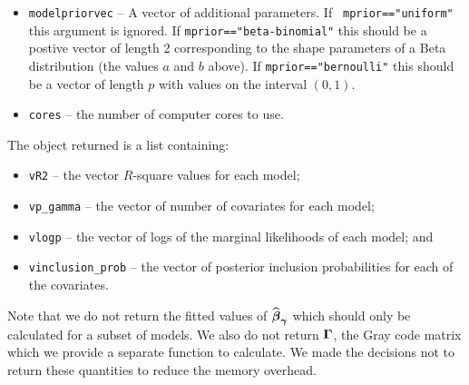 {\begin{itemize}
\begin{itemize}
        \noindent which is a beta-binomial distribution. Note $a=b=1$
        corresponds to a uniform prior on the prior variable inclusion
        probability. The values of $a$ and $b$ should be set to be the first
        and second elements of the {\tt modelpriorvec} argument respectively
        (see below).
		
		\item {\tt "bernoulli"} -- corresponds to a prior of the form 
		$$
		p(\vgamma) = \prod_{j=1}^p \rho_j^{\gamma_j} (1 - \rho_j)^{1 - \gamma_j}
		$$
		
        \noindent where the $\rho_j\in(0,1)$. The $\rho_j$ values are specified
        by {\tt modelpriorvec} (see below). Using $\rho_j = 1/2$, $1\le j\le p$
        corresponds to {\tt mprior=="uniform"}.
	\end{itemize}
	
    \item {\tt modelpriorvec} -- A vector of additional parameters. If {\tt
        mprior=="uniform"} this argument is ignored.
    If {\tt mprior=="beta-binomial"} this should be a postive vector of length
    2 corresponding to the shape parameters of a Beta distribution (the values
    $a$ and $b$ above). If {\tt mprior=="bernoulli"} this should be a vector of
    length $p$ with values on the interval $(0,1)$.
	
	\item {\tt cores} -- the number of computer cores to use.
\end{itemize}

\noindent 
The object returned is a 
list containing:
\begin{itemize}
	\item 
	{\tt vR2} -- the vector $R$-square values for each model; 
	
	\item 
	{\tt vp\_gamma} -- the vector of number of covariates for each model;
	
	\item 
	{\tt vlogp} -- the vector of logs of the marginal likelihoods of each model; and
	
	\item 
	{\tt vinclusion\_prob} -- the vector of posterior inclusion probabilities for each of the covariates. 
\end{itemize}

\noindent Note that we do not return the fitted values of
$\widehat{{\boldsymbol \beta}}_{{\boldsymbol \gamma}}$ which should only be calculated for a subset of
models. We also do not return ${\boldsymbol \Gamma}$, the Gray code matrix which we provide
a separate function to calculate. We made the decisions not to return these
quantities to reduce the memory overhead.

}

